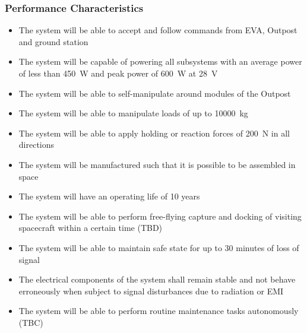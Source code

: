 \documentclass[12pt, letter]{article}
\begin{document}
\subsubsection{Performance Characteristics}
\label{performance}
\begin{itemize}
\setlength\itemsep{0px}
\item{The system will be able to accept and follow commands from EVA, Outpost and ground station}
\item{The system will be capable of powering all subsystems with an average power of less than \SI{450}{\W} and peak power of \SI{600}{\W} at \SI{28}{\V}\cite{RFP}}
\item{The system will be able to self-manipulate around modules of the Outpost}
\item{The system will be able to manipulate loads of up to \SI{10000}{\kg}\cite{RFP}}
\item{The system will be able to apply holding or reaction forces of \SI{200}{\N} in all directions\cite{RFP}}
\item{The system will be manufactured such that it is possible to be assembled in space}
\item{The system will have an operating life of 10 years\cite{RFP}}
\item{The system will be able to perform free-flying capture and docking of visiting spacecraft within a certain time (TBD)}
\item{The system will be able to maintain safe state for up to 30 minutes of loss of signal}
\item{The electrical components of the system shall remain stable and not behave erroneously when subject to signal disturbances due to radiation or EMI}
\item{The system will be able to perform routine maintenance tasks autonomously (TBC)}
\end{itemize}
\end{document}
